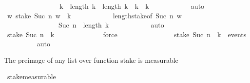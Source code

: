 \begin{isabellebody}
\ \ \ \ \ \ \isamarkupfalse%
{\isacharminus}{\kern0pt}\isanewline
\ \ \ \ \ \ \ \ \isamarkupfalse%
\ {\isachardoublequoteopen}{\isasymAnd}k{}\ {\isachardot}{\kern0pt}\ length\ k{}\ {\isacharless}{\kern0pt}\ length\ k\ {\isasymLongrightarrow}\ k{}\ {\isasymnoteq}\ k{\isachardoublequoteclose}\isanewline
\ \ \ \ \ \ \ \ \ \ \isamarkupfalse%
\ auto\isanewline
\ \ \ \ \ \ \ \ \isamarkupfalse%
\ \isamarkupfalse%
\ {\isachardoublequoteopen}{\isasymAnd}w{\isachardot}{\kern0pt}\ stake\ {\isacharparenleft}{\kern0pt}Suc\ n{\isacharparenright}{\kern0pt}\ w\ {\isasymnoteq}\ k{\isachardoublequoteclose}\isanewline
\ \ \ \ \ \ \ \ \ \ \isamarkupfalse%
\ length{\isacharunderscore}{\kern0pt}stake{\isacharbrackleft}{\kern0pt}of\ {\isachardoublequoteopen}Suc\ n{\isachardoublequoteclose}\ w{\isacharbrackright}{\kern0pt}\isanewline
\ \ \ \ \ \ \ \ \ \ \ \ \ \ \ \ {\isacartoucheopen}Suc\ n\ {\isacharless}{\kern0pt}\ length\ k{\isacartoucheclose}\isanewline
\ \ \ \ \ \ \ \ \ \ \isamarkupfalse%
\ auto\isanewline
\ \ \ \ \ \ \ \ \isamarkupfalse%
\ \isamarkupfalse%
\ {\isachardoublequoteopen}stake\ {\isacharparenleft}{\kern0pt}Suc\ n{\isacharparenright}{\kern0pt}\ {\isacharminus}{\kern0pt}{\isacharbackquote}{\kern0pt}\ {\isacharbraceleft}{\kern0pt}k{\isacharbraceright}{\kern0pt}\ {\isacharequal}{\kern0pt}\ {\isacharbraceleft}{\kern0pt}{\isacharbraceright}{\kern0pt}{\isachardoublequoteclose}\isanewline
\ \ \ \ \ \ \ \ \ \ \isamarkupfalse%
\ force\isanewline
\ \ \ \ \ \ \isamarkupfalse%
\isanewline
\ \ \ \ \ \ \isamarkupfalse%
\ \isamarkupfalse%
\ {\isachardoublequoteopen}stake\ {\isacharparenleft}{\kern0pt}Suc\ n{\isacharparenright}{\kern0pt}\ {\isacharminus}{\kern0pt}{\isacharbackquote}{\kern0pt}\ {\isacharbraceleft}{\kern0pt}k{\isacharbraceright}{\kern0pt}\ {\isasymin}\ events{\isachardoublequoteclose}\isanewline
\ \ \ \ \ \ \ \ \isamarkupfalse%
\ auto\isanewline
\ \ \ \ \isamarkupfalse%
\isanewline
\ \ \isamarkupfalse%
%
\endisatagproof
{\isafoldproof}%
%
\isadelimproof
%
\endisadelimproof
%
\begin{isamarkuptext}%
The preimage of any list over function stake is measurable%
\end{isamarkuptext}\isamarkuptrue%
\isamarkupfalse%
\ stake{\isacharunderscore}{\kern0pt}measurable{\isacharcolon}{\kern0pt}\isanewline

\end{isabellebody}
